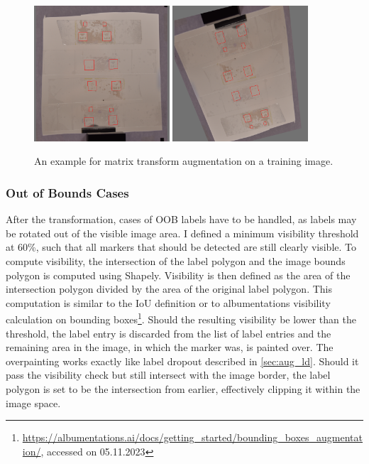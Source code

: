 \documentclass[10pt]{book}
\begin{document}
\begin{figure}
  \centering
     {\includegraphics[width=0.45\textwidth]{image/aug_mat_before}}
     {\includegraphics[width=0.45\textwidth]{image/aug_mat_after}}
  \caption{An example for matrix transform augmentation on a training image.}
  \label{fig:aug_mat_example}
\end{figure}

\subsubsection{Out of Bounds Cases}
\label{sec:oob}

After the transformation, cases of \ac{OOB} labels have to be handled, as labels may be rotated out of the visible image area. I defined a minimum visibility threshold at 60\%, such that all markers that should be detected are still clearly visible. To compute visibility, the intersection of the label polygon and the image bounds polygon is computed using Shapely. Visibility is then defined as the area of the intersection polygon divided by the area of the original label polygon. This computation is similar to the \ac{IoU} definition or to albumentations visibility calculation on bounding boxes\footnote{\url{https://albumentations.ai/docs/getting_started/bounding_boxes_augmentation/}, accessed on 05.11.2023}. Should the resulting visibility be lower than the threshold, the label entry is discarded from the list of label entries and the remaining area in the image, in which the marker was, is painted over. The overpainting works exactly like label dropout described in \autoref{sec:aug_ld}. Should it pass the visibility check but still intersect with the image border, the label polygon is set to be the intersection from earlier, effectively clipping it within the image space.
\end{document}
